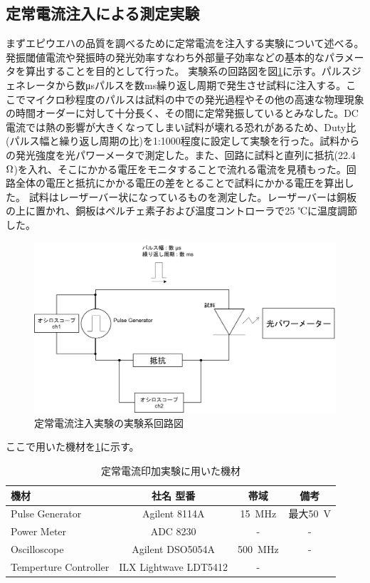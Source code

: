 \subsection{定常電流注入による測定実験}%
まずエピウエハの品質を調べるために定常電流を注入する実験について述べる。発振閾値電流や発振時の発光効率すなわち外部量子効率などの基本的なパラメータを算出することを目的として行った。
実験系の回路図を図\ref{fig:fig_2_2_IL_setup}に示す。パルスジェネレータから数\si{\micro s}パルスを数ms繰り返し周期で発生させ試料に注入する。ここでマイクロ秒程度のパルスは試料の中での発光過程やその他の高速な物理現象の時間オーダーに対して十分長く、その間に定常発振しているとみなした。DC電流では熱の影響が大きくなってしまい試料が壊れる恐れがあるため、Duty比(パルス幅と繰り返し周期の比)を1:1000程度に設定して実験を行った。試料からの発光強度を光パワーメータで測定した。また、回路に試料と直列に抵抗(22.4 $\rm{\Omega}$)を入れ、そこにかかる電圧をモニタすることで流れる電流を見積もった。回路全体の電圧と抵抗にかかる電圧の差をとることで試料にかかる電圧を算出した。
試料はレーザーバー状になっているものを測定した。レーザーバーは銅板の上に置かれ、銅板はペルチェ素子および温度コントローラで25 ℃に温度調節した。

\begin{figure}[htbp]
	\includegraphics[width=15cm]{figure/fig_2_2_IL_setup.png}
	\caption{定常電流注入実験の実験系回路図}
	\label{fig:fig_2_2_IL_setup}
\end{figure}
\clearpage
ここで用いた機材を\ref{table:table_2_2_IL_setup}に示す。
\begin{table}[h]
  \caption{定常電流印加実験に用いた機材}
    \label{table:table_2_2_IL_setup}
  \centering
  \begin{tabular}{lccc}
    \hline
    機材  &社名 型番 &帯域  & 備考  \\
    \hline \hline
    Pulse Generator  & Agilent 8114A & 15\ MHz &最大50\ V \\
    Power Meter  &  ADC 8230 & -&-  \\
    Oscilloscope  &  Agilent DSO5054A &500\ MHz&- \\
    Temperture Controller & ILX Lightwave  LDT5412&-\\
       \hline
  \end{tabular}
\end{table}
